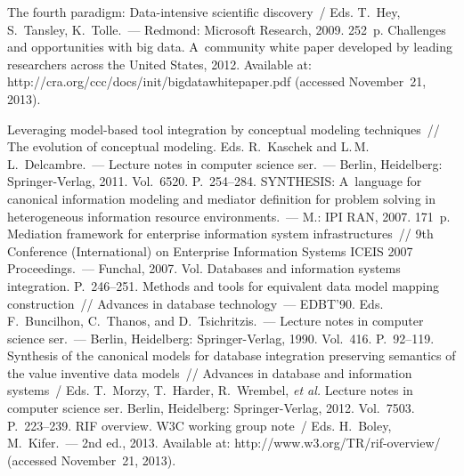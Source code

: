   \begin{multicols}{2}

{\small\frenchspacing
{%
\begin{thebibliography}{99}


The fourth paradigm: Data-intensive scientific discovery~/ Eds. T.~Hey, S.~Tansley,
K.~Tolle.~--- Redmond: Microsoft Research, 2009. 252~p.
Challenges and opportunities with big data.  A~community white paper developed by
leading researchers across the United States, 2012. Available at: {\sf
http://cra.org/ccc/docs/init/bigdatawhitepaper.pdf} (accessed November~21, 2013).

 Leveraging
model-based tool integration by conceptual modeling techniques~// The evolution of
conceptual modeling. Eds. R.~Kaschek and L.\,M.\,L.~Delcambre.~---
 Lecture notes in computer science ser.~---
Berlin, Heidelberg: Springer-Verlag, 2011. Vol.~6520. P.~254--284.
 SYNTHESIS: A~language
for canonical information modeling and mediator definition for problem solving in
heterogeneous information resource environments.~--- M.: IPI RAN, 2007. 171~p.
 Mediation framework for enterprise information system infrastructures~//
9th Conference (International) on Enterprise Information Systems ICEIS 2007 Proceedings.~--- 
Funchal, 2007. Vol. Databases and information systems integration. P.~246--251.
 Methods and tools for equivalent data model mapping
construction~// {Advances in database technology~---
EDBT'90}. Eds. F.~Buncilhon, C.~Thanos, and D.~Tsichritzis.~--- Lecture notes in
computer science ser.~--- Berlin, Heidelberg: Springer-Verlag, 1990. Vol.~416. P.~92--119.
 Synthesis of the canonical models for database
integration preserving semantics of the value inventive data models~// 
{Advances in database and information systems}~/ Eds. T.~Morzy,
T.~H$\ddot{\mbox{a}}$rder, R.~Wrembel,
\textit{et al.} Lecture notes in computer science ser. Berlin, Heidelberg: Springer-Verlag, 
2012. Vol.~7503. P.~223--239.
RIF overview. W3C working group note~/ Eds. H.~Boley, M.~Kifer.~--- 2nd ed.,
2013. Available at: {\sf http://www.w3.org/TR/rif-overview/} (accessed November~21,
2013).


\end{thebibliography}}}
\end{multicols}
